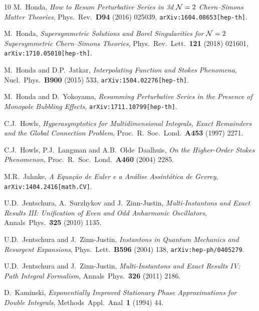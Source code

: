 \documentclass[11pt,a4paper]{article}
\newcommand{\CN}{{\cal N}}
\begin{document}
\begin{thebibliography}{10}
M.~Honda,
\textit{How to Resum Perturbative Series in 3d $\CN=\text{2}$ Chern--Simons Matter Theories},
Phys.\ Rev.\ \textbf{D94} (2016) 025039,
\texttt{arXiv:1604.08653[hep-th]}.

M.~Honda,
\textit{Supersymmetric Solutions and Borel Singularities for $\CN=2$ Supersymmetric Chern--Simons Theories},
Phys.\ Rev.\ Lett.\ \textbf{121} (2018) 021601,
\texttt{arXiv:1710.05010[hep-th]}.

M.~Honda and D.P.~Jatkar,
\textit{Interpolating Function and Stokes Phenomena},
Nucl.\ Phys.\ \textbf{B900} (2015) 533,
\texttt{arXiv:1504.02276[hep-th]}.

M.~Honda and D.~Yokoyama,
\textit{Resumming Perturbative Series in the Presence of Monopole Bubbling Effects},
\texttt{arXiv:1711.10799[hep-th]}.

C.J.~Howls,
\textit{Hyperasymptotics for Multidimensional Integrals, Exact Remainders and the Global Connection Problem},
Proc.\ R.\ Soc.\ Lond.\ \textbf{A453} (1997) 2271.

C.J.~Howls, P.J.~Langman and A.B.~Olde~Daalhuis,
\textit{On the Higher-Order Stokes Phenomenon},
Proc.\ R.\ Soc.\ Lond.\ \textbf{A460} (2004) 2285.

M.R.~Jahnke,
\textit{A Equa\c c\~ao de Euler e a An\'alise Assint\'otica de Gevrey},
\texttt{arXiv:1404.2416[math.CV]}.

U.D.~Jentschura, A.~Surzhykov and J.~Zinn-Justin,
\textit{Multi-Instantons and Exact Results III: Unification of Even and Odd Anharmonic Oscillators},
Annals\ Phys.\ \textbf{325} (2010) 1135.

U.D.~Jentschura and J.~Zinn-Justin,
\textit{Instantons in Quantum Mechanics and Resurgent Expansions},
Phys.\ Lett.\ \textbf{B596} (2004) 138,
\texttt{arXiv:hep-ph/0405279}.

U.D.~Jentschura and J.~Zinn-Justin,
\textit{Multi-Instantons and Exact Results IV: Path Integral Formalism},
Annals\ Phys.\ \textbf{326} (2011) 2186.

D.~Kaminski,
\textit{Exponentially Improved Stationary Phase Approximations for Double Integrals},
Methods\ Appl.\ Anal\ \textbf{1} (1994) 44.


\end{thebibliography}
\end{document}
